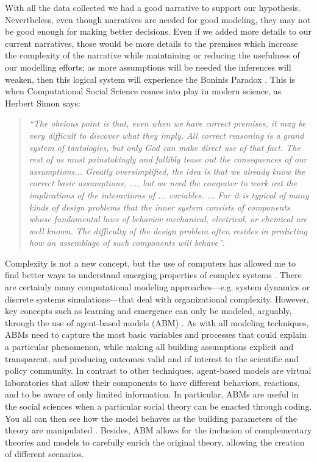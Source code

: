 \documentclass{article}
\begin{document}
With all the data collected we had a good narrative to support our hypothesis. Nevertheless, even though narratives are needed for good modeling, they may not be good enough for making better decisions. Even if we added more details to our current narratives, those would be more details to the premises which increase the complexity of the narrative while maintaining or reducing the usefulness of our modelling efforts; as more assumptions will be needed the inferences will weaken, then this logical system will experience the Bonini\textquotesingle s Paradox \cite{bonini_simulation_1963}. This is when Computational Social Science comes into play in modern science, as Herbert Simon says:
\begin{quote}
\emph{``The obvious point is that, even when we have correct premises, it may be very difficult to discover what they imply. All correct reasoning is a grand system of tautologies, but only God can make direct use of that fact. The rest of us must painstakingly and fallibly tease out the consequences of our assumptions... Greatly oversimplified, the idea is that we already know the correct basic assumptions, ..., but we need the computer to work out the implications of the interactions of ... variables. ... For it is typical of many kinds of design problems that the inner system consists of components whose fundamental laws of behavior mechanical, electrical, or chemical are well known. The difficulty of the design problem often resides in predicting how an assemblage of such components will behave''}\cite{simon_sciences_1996}.
\end{quote}
Complexity is not a new concept, but the use of computers has allowed me to find better ways to understand emerging properties of complex systems \cite{simon_sciences_1996}. There are certainly many computational modeling approaches---e.g. system dynamics or discrete systems simulations---that deal with organizational complexity. However, key concepts such as learning and emergence can only be modeled, arguably, through the use of agent-based models (ABM) \cite{cioffi-revilla_introduction_2014,miller_complex_2007,gilbert_simulation_2005,epstein_growing_1996}. As with all modeling techniques, ABMs need to capture the most basic variables and processes that could explain a particular phenomenon, while making all building assumptions explicit and transparent, and producing outcomes valid and of interest to the scientific and policy community. In contrast to other techniques, agent-based models are virtual laboratories that allow their components to have different behaviors, reactions, and to be aware of only limited information. In particular, ABMs are useful in the social sciences when a particular social theory can be enacted through coding. You all can then see how the model behaves as the building parameters of the theory are manipulated \cite{miller_complex_2007,epstein_growing_1996}. Besides, ABM allows for the inclusion of complementary theories and models to carefully enrich the original theory, allowing the creation of different scenarios.
\end{document}
